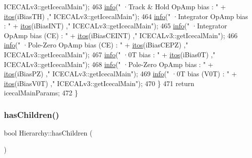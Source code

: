 \begin{DoxyCode}
{      ICECALv3::getIcecalMain"});
463         \hyperlink{classObject_a644fd329ea4cb85f54fa6846484b84a8}{info}(\textcolor{stringliteral}{"   ·Track & Hold OpAmp bias          : "} + \hyperlink{Tools_8h_af330027dbdafb9a30768b3613c553e60}{itos}(iBiasTH)          ,\textcolor{stringliteral}{"
      ICECALv3::getIcecalMain"});
464         \hyperlink{classObject_a644fd329ea4cb85f54fa6846484b84a8}{info}(\textcolor{stringliteral}{"   ·Integrator OpAmp bias            : "} + \hyperlink{Tools_8h_af330027dbdafb9a30768b3613c553e60}{itos}(iBiasINT)         ,\textcolor{stringliteral}{"
      ICECALv3::getIcecalMain"});
465         \hyperlink{classObject_a644fd329ea4cb85f54fa6846484b84a8}{info}(\textcolor{stringliteral}{"   ·Integrator OpAmp bias (CE)       : "} + \hyperlink{Tools_8h_af330027dbdafb9a30768b3613c553e60}{itos}(iBiasCEINT)       ,\textcolor{stringliteral}{"
      ICECALv3::getIcecalMain"});
466         \hyperlink{classObject_a644fd329ea4cb85f54fa6846484b84a8}{info}(\textcolor{stringliteral}{"   ·Pole-Zero OpAmp bias (CE)        : "} + \hyperlink{Tools_8h_af330027dbdafb9a30768b3613c553e60}{itos}(iBiasCEPZ)        ,\textcolor{stringliteral}{"
      ICECALv3::getIcecalMain"});
467         \hyperlink{classObject_a644fd329ea4cb85f54fa6846484b84a8}{info}(\textcolor{stringliteral}{"   ·0T bias                    : "} + \hyperlink{Tools_8h_af330027dbdafb9a30768b3613c553e60}{itos}(iBias0T)            ,\textcolor{stringliteral}{"
      ICECALv3::getIcecalMain"});
468         \hyperlink{classObject_a644fd329ea4cb85f54fa6846484b84a8}{info}(\textcolor{stringliteral}{"   ·Pole-Zero OpAmp bias             : "} + \hyperlink{Tools_8h_af330027dbdafb9a30768b3613c553e60}{itos}(iBiasPZ)          ,\textcolor{stringliteral}{"
      ICECALv3::getIcecalMain"});
469         \hyperlink{classObject_a644fd329ea4cb85f54fa6846484b84a8}{info}(\textcolor{stringliteral}{"   ·0T bias (V0T)              : "} + \hyperlink{Tools_8h_af330027dbdafb9a30768b3613c553e60}{itos}(iBiasV0T)           ,\textcolor{stringliteral}{"
      ICECALv3::getIcecalMain"});
470     \}
471     \textcolor{keywordflow}{return} icecalMainParams;
472 \}
\end{DoxyCode}
\mbox{\label{classHierarchy_a255174fe4d316d2a3f430dcb9dab29f1}} 
\subsubsection{\texorpdfstring{has\+Children()}{hasChildren()}}
{\footnotesize\ttfamily bool Hierarchy\+::has\+Children (\begin{DoxyParamCaption}{ }\end{DoxyParamCaption})\hspace{0.3cm}{\ttfamily [inherited]}}



